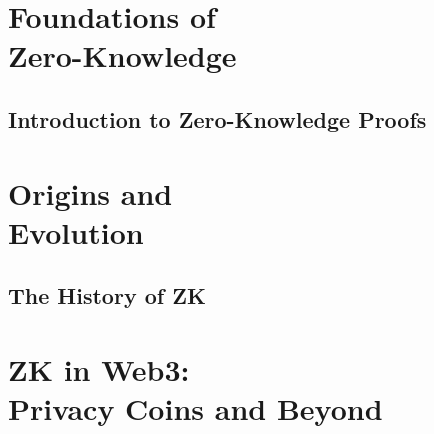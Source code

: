 \usepackage{lipsum}
\usepackage[automake,toc]{glossaries}
\usepackage{caption}
\usepackage{listings}
\usepackage{xcolor}
\usepackage{amsmath}
\usepackage{amssymb}
\makeglossaries



\coverpage{\TITLE}{\SUBTITLE}{\AUTHOR}{\DATE}{\SUBJECT}
\newpage
\tableofcontents

\part{Foundations of\\Zero-Knowledge}
\newpage
\chapter{Introduction to Zero-Knowledge Proofs} \label{ch:introduction}


\part{Origins and\\Evolution}
\newpage
\chapter{The History of ZK} \label{ch:history}


\part{ZK in Web3:\\Privacy Coins and Beyond}
\newpage
